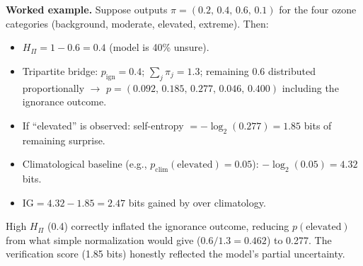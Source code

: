 \textbf{Worked example.} Suppose \clyfar{} outputs $\pi = (0.2,\, 0.4,\, 0.6,\, 0.1)$ for the four ozone categories (background, moderate, elevated, extreme). Then:
\begin{itemize}[leftmargin=2em]
\item $H_\Pi = 1 - 0.6 = 0.4$ (model is 40\% unsure).
\item Tripartite bridge: $p_{\text{ign}} = 0.4$; $\sum_j \pi_j = 1.3$; remaining 0.6 distributed proportionally $\to$ $p = (0.092,\, 0.185,\, 0.277,\, 0.046,\, 0.400)$ including the ignorance outcome.
\item If ``elevated'' is observed: self-entropy $= -\log_2(0.277) = 1.85$ bits of remaining surprise.
\item Climatological baseline (e.g., $p_{\text{clim}}(\text{elevated}) = 0.05$): $-\log_2(0.05) = 4.32$ bits.
\item $\text{IG} = 4.32 - 1.85 = 2.47$ bits gained by \clyfar{} over climatology.
\end{itemize}
High $H_\Pi$ (0.4) correctly inflated the ignorance outcome, reducing $p(\text{elevated})$ from what simple normalization would give ($0.6/1.3 = 0.462$) to 0.277. The verification score (1.85 bits) honestly reflected the model's partial uncertainty.
